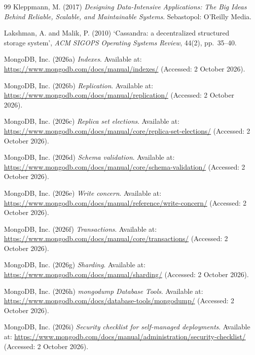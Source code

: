 \documentclass[11pt,a4paper]{article}
\begin{document}
\begin{thebibliography}{99}
 Kleppmann, M. (2017) \textit{Designing Data-Intensive Applications: The Big Ideas Behind Reliable, Scalable, and Maintainable Systems}. Sebastopol: O'Reilly Media.

 Lakshman, A. and Malik, P. (2010) `Cassandra: a decentralized structured storage system', \textit{ACM SIGOPS Operating Systems Review}, 44(2), pp.~35--40.

 MongoDB, Inc. (2026a) \textit{Indexes}. Available at: \url{https://www.mongodb.com/docs/manual/indexes/} (Accessed: 2 October 2026).

 MongoDB, Inc. (2026b) \textit{Replication}. Available at: \url{https://www.mongodb.com/docs/manual/replication/} (Accessed: 2 October 2026).

 MongoDB, Inc. (2026c) \textit{Replica set elections}. Available at: \url{https://www.mongodb.com/docs/manual/core/replica-set-elections/} (Accessed: 2 October 2026).

 MongoDB, Inc. (2026d) \textit{Schema validation}. Available at: \url{https://www.mongodb.com/docs/manual/core/schema-validation/} (Accessed: 2 October 2026).

 MongoDB, Inc. (2026e) \textit{Write concern}. Available at: \url{https://www.mongodb.com/docs/manual/reference/write-concern/} (Accessed: 2 October 2026).

 MongoDB, Inc. (2026f) \textit{Transactions}. Available at: \url{https://www.mongodb.com/docs/manual/core/transactions/} (Accessed: 2 October 2026).

 MongoDB, Inc. (2026g) \textit{Sharding}. Available at: \url{https://www.mongodb.com/docs/manual/sharding/} (Accessed: 2 October 2026).

 MongoDB, Inc. (2026h) \textit{mongodump Database Tools}. Available at: \url{https://www.mongodb.com/docs/database-tools/mongodump/} (Accessed: 2 October 2026).

 MongoDB, Inc. (2026i) \textit{Security checklist for self-managed deployments}. Available at: \url{https://www.mongodb.com/docs/manual/administration/security-checklist/} (Accessed: 2 October 2026).


\end{thebibliography}
\end{document}
